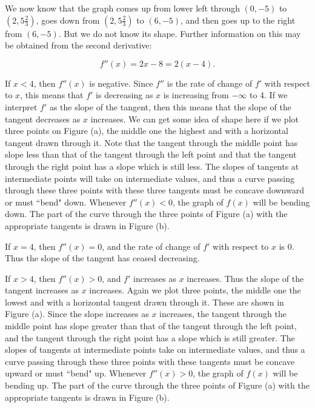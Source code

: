 We now know that the graph comes up from lower left through $(0, -5)$ to $(2, 5\frac{2}{3})$, goes down from $(2, 5\frac{2}{3})$ to $(6, -5)$, and then goes up to the right from $(6, -5)$. But we do not know its shape. 
Further information on this may be obtained from the second derivative:

$$
f''(x) = 2x - 8 = 2(x - 4).
$$

If $x < 4$, then $f''(x)$ is negative. Since $f''$ is the rate of change of $f'$ with respect to $x$, this means that $f'$ is decreasing as $x$ is increasing from $-\infty$ to 4. If we interpret $f'$ as the slope of the tangent, then this means that the slope of the tangent decreases as $x$ increases.
We can get some idea of shape here if we plot three points on Figure (a), the middle one the highest and with a horizontal tangent drawn through it. Note that the tangent through the middle point has slope less than that of the tangent through the left point
and that the tangent through the right point has a slope which is still less. The slopes of tangents at intermediate points will take on intermediate values, and thus a curve passing through these three points with these three tangents must be concave downward or must ``bend" down. Whenever $f''(x) < 0$, the graph of $f(x)$ will be bending down. The part of the curve through the three points of Figure (a) with the appropriate tangents is drawn in Figure (b).


If $x = 4$, then $f''(x) = 0$, and the rate of change of $f'$ with respect to $x$ is 0. Thus the slope of the tangent has ceased decreasing.

If $x > 4$, then $f''(x) > 0$, and $f'$ increases as $x$ increases. Thus the slope of the tangent increases as $x$ increases. Again we plot three points, the middle one the lowest and with a horizontal tangent drawn through it. These are shown in Figure (a). Since the slope increases as $x$ increases, the tangent through the middle point has slope greater than that of the tangent through the left point, and the tangent through the right point has a slope which is still greater. The slopes of tangents at intermediate points take on intermediate values, and thus a curve passing through these three points with these tangents must be concave upward or must ``bend" up. Whenever $f''(x) > 0$, the graph of $f(x)$ will be bending up. The part of the curve through the three points of Figure (a) with the appropriate tangents is drawn in Figure (b).

